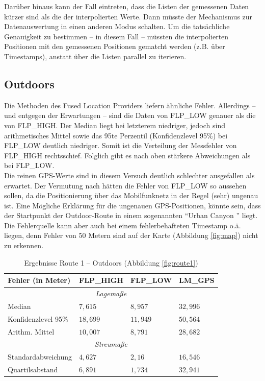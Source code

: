 Darüber hinaus kann der Fall eintreten, dass die Listen der gemessenen Daten kürzer sind als die der interpolierten Werte. Dann müsste der Mechanismus zur Datenauswertung in einen anderen Modus schalten. Um die tatsächliche Genauigkeit zu bestimmen -- in diesem Fall -- müssten die interpolierten Positionen mit den gemessenen Positionen gematcht werden (z.B. über Timestamps), anstatt über die Listen parallel zu iterieren.

\subsection{Outdoors}

Die Methoden des Fused Location Providers liefern ähnliche Fehler. Allerdings -- und entgegen der Erwartungen -- sind die Daten von FLP\_LOW genauer als die von FLP\_HIGH. Der Median liegt bei letzterem niedriger, jedoch sind arithmetisches Mittel sowie das 95te Perzentil (Konfidenzlevel 95\%) bei FLP\_LOW deutlich niedriger. Somit ist die Verteilung der Messfehler von FLP\_HIGH rechtsschief. Folglich gibt es nach oben stärkere Abweichungen als bei FLP\_LOW. \\

Die reinen GPS-Werte sind in diesem Versuch deutlich schlechter ausgefallen als erwartet. Der Vermutung nach hätten die Fehler von FLP\_LOW so aussehen sollen, da die Positionierung über das Mobilfunknetz in der Regel (sehr) ungenau ist. Eine Mögliche Erklärung für die ungenauen GPS-Positionen, könnte sein, dass der Startpunkt der Outdoor-Route in einem sogenannten "`Urban Canyon "' liegt. Die Fehlerquelle kann aber auch bei einem fehlerbehafteten Timestamp o.ä. liegen, denn Fehler von 50 Metern sind auf der Karte (Abbildung \ref{fig:map}) nicht zu erkennen.

\renewcommand{\arraystretch}{1.2}
\begin{table}[h!]
	\centering
	\caption{Ergebnisse Route 1 -- Outdoors (Abbildung \ref{fig:route1})}
	\begin{tabular}{|l|l|l|l|}
	\hline
	Fehler (in Meter) & FLP\_HIGH & FLP\_LOW & LM\_GPS \\
	\hline
	\multicolumn{4}{|c|}{\textit{Lagemaße}}\\
	\hline
	Median & $7,615$ & $8,957$ & $32,996$ \\
	Konfidenzlevel 95\% & $18,699$ & $11,949$ & $50,564$ \\
	Arithm. Mittel & $10,007$ & $8,791$ & $28,682$ \\
	\hline
	\multicolumn{4}{|c|}{\textit{Streumaße}}\\
	\hline
	Standardabweichung & $4,627$ & $2,16$ & $16,546$ \\
	Quartilsabstand & $6,891$ & $1,734$ & $32,941$ \\
	\hline
	\end{tabular}
\end{table}

